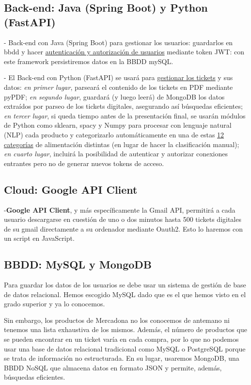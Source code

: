 \documentclass[a4paper,12pt]{report}
\begin{document}
	
		 
		\subsection{Back-end: Java (Spring Boot) y Python (FastAPI)}
		
			- Back-end con Java (Spring Boot) para gestionar los usuarios: guardarlos en bbdd y hacer \underline{autenticación y autorización de usuarios} mediante token JWT: con este framework persistiremos datos en la BBDD mySQL.
			
			- El Back-end con Python (FastAPI) se usará para \underline{gestionar los tickets} y sus datos: \textit{en primer lugar}, parseará el contenido de los tickets en PDF mediante pyPDF; \textit{en segundo lugar}, guardará (y luego leerá) de MongoDB los datos extraídos por parseo de los tickets digitales, asegurando así búsquedas eficientes; \textit{en tercer lugar}, si queda tiempo antes de la presentación final, se usarán módulos de Python como sklearn, spacy y Numpy para procesar con lenguaje natural (NLP) cada producto y categorizarlo automáticamente en una de estas \href{https://github.com/blackcub3s/mercApp/blob/main/APP%20WEB/__frontend__produccio__/app/js/dashboard/categories.js}{12 categorías} de alimentación distintas (en lugar de hacer la clasificación manual); \textit{en cuarto lugar}, incluirá la posibilidad de autenticar y autorizar conexiones entrantes pero no de generar nuevos tokens de acceso.
			
		
		\subsection{Cloud: Google API Client}
		
					-\textbf{Google API Client}, y más específicamente la Gmail API, permitirá a cada usuario descargarse en cuestión de uno o dos minutos hasta 500 tickets digitales de su gmail directamente a su ordenador mediante Oauth2. Esto lo haremos con un script en JavaScript.
			
		\subsection{BBDD: MySQL y MongoDB}
		
		
		Para guardar los datos de los usuarios se debe usar un sistema de gestión de base de datos relacional. Hemos escogido MySQL dado que es el que hemos visto en el grado superior y ya lo conocemos.
		
		Sin embargo, los productos de Mercadona no los conocemos de antemano ni tenemos una lista exhaustiva de los mismos. Además, el número de productos que se pueden encontrar en un ticket varía en cada compra, por lo que no podemos usar una base de datos relacional tradicional como MySQL o PostgreSQL porque se trata de información no estructurada. En su lugar, usaremos MongoDB, una BBDD NoSQL que almacena datos en formato JSON y permite, además, búsquedas eficientes.
		
\end{document}
